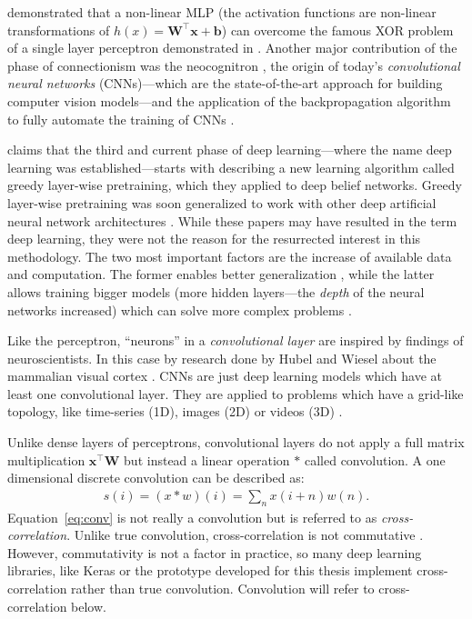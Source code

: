 \documentclass[]{article}
\begin{document}
\citet{hornik_et_al_1989} demonstrated that a non-linear MLP
(the activation functions are non-linear transformations of
$h(x) = \mathbf{W}^\top\mathbf{x} + \mathbf{b}$) can overcome the
famous XOR problem of a single layer perceptron demonstrated in
\citet{minsky_et_al_1969}.
Another major contribution of the phase of connectionism was the
neocognitron \citep{fukushima_1980}, the origin of today's
\textit{convolutional neural networks} (CNNs)---which are the
state-of-the-art approach for building computer vision models---and
the application of the backpropagation algorithm to fully automate the
training of CNNs \citep{lecun_et_al_1989}.

\citet{goodfellow_et_al_2016} claims that the third and current phase
of deep learning---where the name deep learning was
established---starts with \citet{hinton_et_al_2006} describing a new
learning algorithm called greedy layer-wise pretraining, which they
applied to deep belief networks.
Greedy layer-wise pretraining was soon generalized to work with other
deep artificial neural network architectures
\citep{renzato_et_al_2006, bengio_et_al_2007}.
While these papers may have resulted in the term deep learning,
they were not the reason for the resurrected interest in this
methodology.
The two most important factors are the increase of available data
and computation.
The former enables better generalization
\citep{goodfellow_et_al_2016}, while the latter allows
training bigger models (more hidden layers---the \textit{depth} of the
neural networks increased) which can solve more complex problems
\citep{bengio_et_al_2007a, goodfellow_et_al_2016}.

Like the perceptron, ``neurons'' in a \textit{convolutional layer}
are inspired by findings of neuroscientists.
In this case by research done by Hubel and Wiesel about the
mammalian visual cortex
\citep{hubel_et_al_1959, hubel_et_al_1962, hubel_et_al_1968}.
CNNs are just deep learning models which have at least one
convolutional layer. They are applied to problems which have a
grid-like topology, like time-series (1D), images (2D) or videos (3D)
\citep{goodfellow_et_al_2016}.

Unlike dense layers of perceptrons, convolutional layers do not apply
a full matrix multiplication $\mathbf{x}^\top\mathbf{W}$ but instead
a linear operation $*$ called convolution.
A one dimensional discrete convolution can be described as:
\begin{align}
  \label{eq:conv}
  s(i) = (x * w)(i) = \sum_n x(i + n)w(n).
\end{align}
Equation~\ref{eq:conv} is not really a convolution but is referred to
as \textit{cross-correlation}.
Unlike true convolution, cross-correlation is not commutative
\citep{goodfellow_et_al_2016}.
However, commutativity is not a factor in practice, so many deep
learning libraries, like Keras \citep{keras} or the prototype
developed for this thesis implement cross-correlation rather than true
convolution.
Convolution will refer to cross-correlation below.
\end{document}
